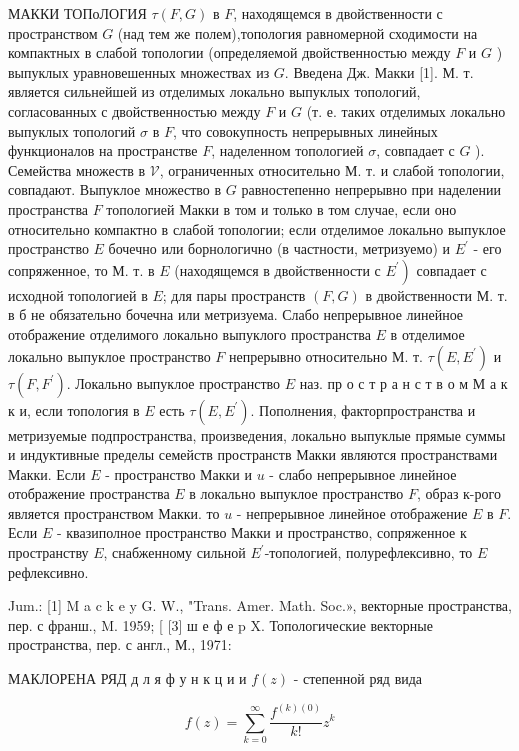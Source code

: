 \documentclass[10pt]{article}
\begin{document}
МАККИ ТОПоЛОГИЯ $\tau(F, G)$ в $F$, находящемся в двойственности с пространством $G$ (над тем же полем),топология равномерной сходимости на компактных в слабой топологии (определяемой двойственностью между $F$ и $G$ ) выпуклых уравновешенных множествах из $G$. Введена Дж. Макки [1]. М. т. является сильнейшей из отделимых локально выпуклых топологий, согласованных с двойственностью между $F$ и $G$ (т. е. таких отделимых локально выпуклых топологий $\mathscr{\sigma}$ в $F$, что совокупность непрерывных линейных функционалов на пространстве $F$, наделенном топологией $\mathscr{\sigma}$, совпадает с $G$ ). Семейства множеств в $\mathscr{V}$, ограниченных относительно М. т. и слабой топологии, совпадают. Выпуклое множество в $G$ равностепенно непрерывно при наделении пространства $F$ топологией Макки в том и только в том случае, если оно относительно компактно в слабой топологии; если отделимое локально выпуклое пространство $E$ бочечно или борнологично (в частности, метризуемо) и $E^{\prime}$ - его сопряженное, то М. т. в $E$ (находящемся в двойственности с $\left.E^{\prime}\right)$ совпадает с исходной топологией в $E$; для пары пространств $(F, G)$ в двойственности М. т. в б не обязательно бочечна или метризуема. Слабо непрерывное линейное отображение отделимого локально выпуклого пространства $E$ в отделимое локально выпуклое пространство $F$ непрерывно относительно М. т. $\tau\left(E, E^{\prime}\right)$ и $\tau\left(F, F^{\prime}\right)$. Локально выпуклое пространство $E$ наз. пр о с т р а н с т в о м М а к к и, если топология в $E$ есть $\tau\left(E, E^{\prime}\right)$. Пополнения, факторпространства и метризуемые подпространства, произведения, локально выпуклые прямые суммы и индуктивные пределы семейств пространств Макки являются пространствами Макки. Если $E$ - пространство Макки и $u$ - слабо непрерывное линейное отображение пространства $E$ в локально выпуклое пространство $F$, образ к-рого является пространством Макки. то $u$ - непрерывное линейное отображение $E$ в $F$. Если $E$ - квазиполное пространство Макки и пространство, сопряженное к пространству $E$, снабженному сильной $E^{\prime}$-топологией, полурефлексивно, то $E$ рефлексивно.



Jum.: [1] M a c k e y G. W., "Trans. Amer. Math. Soc.», векторные пространства, пер. с франш., M. 1959; [ [3] ш е ф е p X. Топологические векторные пространства, пер. с англ., М., 1971:



МАКЛОРЕНА РЯД д л я ф у н к ц и и $f(z)$ - степенной ряд вида



\[

f(z)=\sum_{k=0}^{\infty} \frac{f^{(k)(0)}}{k !} z^{k}

\]
\end{document}
